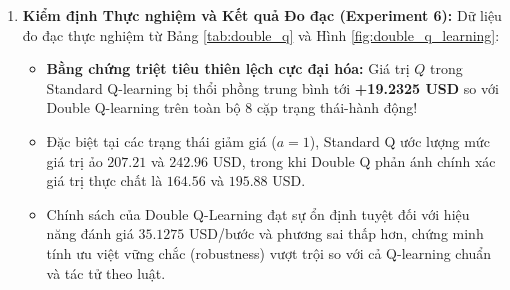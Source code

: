 \documentclass[12pt,a4paper]{article}
\begin{document}
\begin{enumerate}
\begin{itemize}
        \item \textbf{Phương pháp ra quyết định:} Phối hợp Double Q-Learning với chiến lược thăm dò thích nghi Boltzmann/Softmax ($P(a|s) \propto \exp(Q(s, a)/\tau)$), loại bỏ việc thử nghiệm ngẫu nhiên đồng đều các hành động thảm họa.
    \end{itemize}
    \item \textbf{Kiểm định Thực nghiệm và Kết quả Đo đạc (Experiment 6):}
    Dữ liệu đo đạc thực nghiệm từ Bảng \ref{tab:double_q} và Hình \ref{fig:double_q_learning}:
    \begin{itemize}
        \item \textbf{Bằng chứng triệt tiêu thiên lệch cực đại hóa:} Giá trị $Q$ trong Standard Q-learning bị thổi phồng trung bình tới \textbf{+19.2325 USD} so với Double Q-learning trên toàn bộ 8 cặp trạng thái-hành động!
        \item Đặc biệt tại các trạng thái giảm giá ($a=1$), Standard Q ước lượng mức giá trị ảo $207.21$ và $242.96$ USD, trong khi Double Q phản ánh chính xác giá trị thực chất là $164.56$ và $195.88$ USD.
        \item Chính sách của Double Q-Learning đạt sự ổn định tuyệt đối với hiệu năng đánh giá $35.1275$ USD/bước và phương sai thấp hơn, chứng minh tính ưu việt vững chắc (robustness) vượt trội so với cả Q-learning chuẩn và tác tử theo luật.
    \end{itemize}
\end{enumerate}
\end{document}
